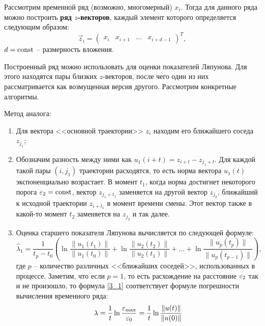 
Рассмотрим временной ряд (возможно, многомерный) $x_i$. Тогда для данного ряда можно построить \textbf{ряд $z$-векторов}, каждый элемент которого определяется следующим образом:
\begin{equation*}
    \vec z_i = \begin{pmatrix}
        x_i & x_{i+1} & \dots & x_{i+d-1}
    \end{pmatrix}^T,
\end{equation*}
$d = \mathrm{const}$ -- размерность вложения.

Построенный ряд можно использовать для оценки показателей Ляпунова. Для этого находятся пары близких $z$-векторов, после чего один из них рассматривается как возмущенная версия другого. Рассмотрим конкретные алгоритмы.

Метод аналога:
\begin{enumerate}
\item
    Для вектора <<основной траектории>> $z_i$ находим его ближайшего соседа $z_{j_1}$;
\item
    Обозначим разность между ними как $u_1(i+t) = z_{i+t} - z_{j_1+t}$.
    Для каждой такой пары $(i, j_1)$ траектории расходятся, то есть норма вектора $u_1(t)$ экспоненциально возрастает.
    В момент $t_1$, когда норма достигнет некоторого порога $\varepsilon_2 = \mathrm{const}$, вектор $z_{j_1+t_1}$ заменяется на другой вектор $z_{j_2}$, ближайший к исходной траектории $z_{i+t_1}$ в момент времени смены.
    Этот вектор также в какой-то момент $t_2$ заменяется на $z_{j_3}$ и так далее.
\item
    Оценка старшего показателя Ляпунова вычисляется по следующей формуле:
    \begin{equation}
    \label{3_1}
        \hat{\lambda}_1 = 
        \frac{1}{t_p - t_0} \left(
            \ln \frac{\|u_1(t_1)\|}{\|u_1(t_0)\|} +
            \ln \frac{\|u_2(t_2)\|}{\|u_2(t_1)\|} +
            \dots +
            \ln \frac{\|u_p(t_p)\|}{\|u_p(t_{p-1})\|}
        \right),
    \end{equation}
    где $p$ -- количество различных <<ближайших соседей>>, использованных в процессе.
    Заметим, что если $p=1$, то есть расхождение на расстояние $\varepsilon_2$ так и не произошло, то формула \eqref{3_1} соответствует формуле погрешности вычисления временного ряда:
    \begin{equation*}
        \lambda = \frac{1}{t} \ln \frac{\varepsilon_{\text{max}}}{\varepsilon_0} = \frac{1}{t} \ln \frac{\|u(t)\|}{\|u(0)\|}
    \end{equation*}
\end{enumerate}


